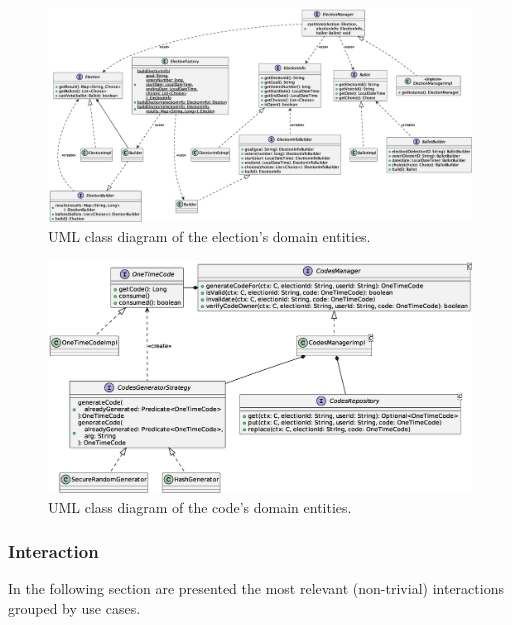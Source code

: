 \documentclass{scrartcl}
\begin{document}
\begin{landscape}
    \begin{figure}
        \centering
        \includegraphics[width=\linewidth]{figures/election-design.eps}
        \caption{UML class diagram of the election's domain entities.}
        \label{fig:election-design} 
    \end{figure}
\end{landscape}

\begin{figure}
    \centering
    \includegraphics[width=\linewidth]{figures/codes-design.eps}
    \caption{UML class diagram of the code's domain entities.}
    \label{fig:codes-design} 
\end{figure}

\subsubsection{Interaction}

In the following section are presented the most relevant (non-trivial) interactions grouped by use cases.
\end{document}
